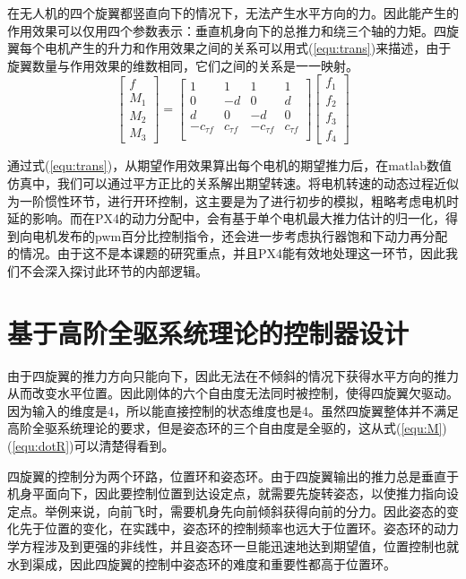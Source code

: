 在无人机的四个旋翼都竖直向下的情况下，无法产生水平方向的力。因此能产生的作用效果可以仅用四个参数表示：垂直机身向下的总推力和绕三个轴的力矩。四旋翼每个电机产生的升力和作用效果之间的关系可以用式(\ref{equ:trans})来描述，由于旋翼数量与作用效果的维数相同，它们之间的关系是一一映射。
\begin{equation}
  \begin{bmatrix}
    f \\
    M_1 \\
     M_2\\M_3
    \end{bmatrix}=\begin{bmatrix}
    1 &1  & 1 & 1 \\
    0 & -d & 0 & d \\
    d & 0 & -d & 0 \\
    -c_{\tau f} & c_{\tau f} & -c_{\tau f} & c_{\tau f} \\
    \end{bmatrix}\begin{bmatrix}
     f_1\\
    f_2 \\
     f_3\\f_4
    \end{bmatrix}  
    \label{equ:trans}
\end{equation}

通过式(\ref{equ:trans})，从期望作用效果算出每个电机的期望推力后，在matlab数值仿真中，我们可以通过平方正比的关系解出期望转速。将电机转速的动态过程近似为一阶惯性环节，进行开环控制，这主要是为了进行初步的模拟，粗略考虑电机时延的影响。而在PX4的动力分配中，会有基于单个电机最大推力估计的归一化，得到向电机发布的pwm百分比控制指令，还会进一步考虑执行器饱和下动力再分配的情况。由于这不是本课题的研究重点，并且PX4能有效地处理这一环节，因此我们不会深入探讨此环节的内部逻辑。


\section{基于高阶全驱系统理论的控制器设计}

由于四旋翼的推力方向只能向下，因此无法在不倾斜的情况下获得水平方向的推力从而改变水平位置。因此刚体的六个自由度无法同时被控制，使得四旋翼欠驱动。因为输入的维度是4，所以能直接控制的状态维度也是4。虽然四旋翼整体并不满足高阶全驱系统理论的要求，但是姿态环的三个自由度是全驱的，这从式(\ref{equ:M})(\ref{equ:dotR})可以清楚得看到。

四旋翼的控制分为两个环路，位置环和姿态环。由于四旋翼输出的推力总是垂直于机身平面向下，因此要控制位置到达设定点，就需要先旋转姿态，以使推力指向设定点。举例来说，向前飞时，需要机身先向前倾斜获得向前的分力。因此姿态的变化先于位置的变化，在实践中，姿态环的控制频率也远大于位置环。姿态环的动力学方程涉及到更强的非线性，并且姿态环一旦能迅速地达到期望值，位置控制也就水到渠成，因此四旋翼的控制中姿态环的难度和重要性都高于位置环。

